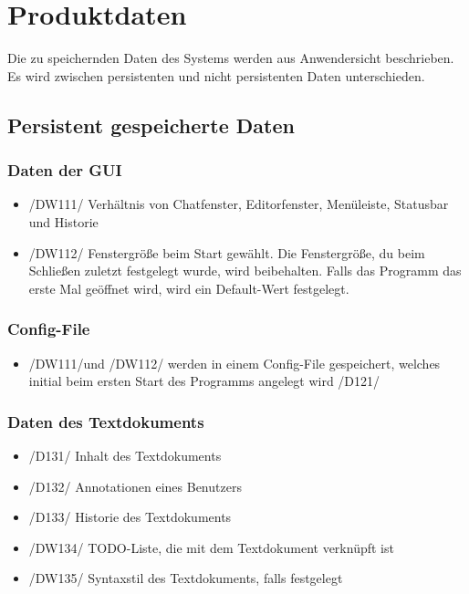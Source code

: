 \documentclass{scrartcl}
\begin{document}
\section{Produktdaten} \label{produktdaten}

Die zu speichernden Daten des Systems werden aus Anwendersicht beschrieben. \\
Es wird zwischen persistenten und nicht persistenten Daten unterschieden.
\subsection{Persistent gespeicherte Daten}

\subsubsection{Daten der GUI}
\begin{itemize}
\item {/DW111/ Verhältnis von Chatfenster, Editorfenster, Menüleiste, Statusbar und Historie}
\item {/DW112/ Fenstergröße beim Start gewählt. Die Fenstergröße, du beim Schließen zuletzt festgelegt wurde, wird beibehalten. Falls das Programm das erste Mal geöffnet wird, wird ein Default-Wert festgelegt.}
\end{itemize}
\subsubsection{Config-File}
\begin{itemize}
\item {/DW111/und /DW112/ werden in einem Config-File gespeichert, welches initial beim ersten Start des Programms angelegt wird} /D121/
\end{itemize}
\subsubsection{Daten des Textdokuments}
\begin{itemize}
\item /D131/ Inhalt des Textdokuments 
\item /D132/ Annotationen eines Benutzers
\item /D133/ Historie des Textdokuments
\item /DW134/ TODO-Liste, die mit dem Textdokument verknüpft ist
\item /DW135/ Syntaxstil des Textdokuments, falls festgelegt
\end{itemize}
\end{document}
